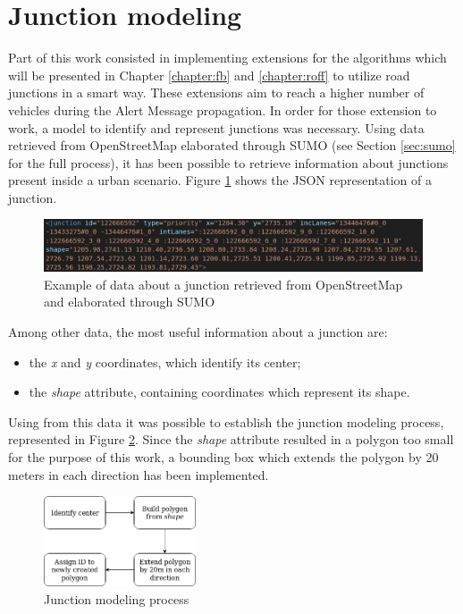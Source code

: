 	\section{Junction modeling}
		\label{sec:junction-modeling}
		Part of this work consisted in implementing extensions for the algorithms which will be presented in Chapter \ref{chapter:fb} and \ref{chapter:roff} to utilize road junctions in a smart way. These extensions aim to reach a higher number of vehicles during the Alert Message propagation. In order for those extension to work, a model to identify and represent junctions was necessary. Using data retrieved from OpenStreetMap elaborated through SUMO (see Section \ref{sec:sumo} for the full process), it has been possible to retrieve information about junctions present inside a urban scenario. Figure \ref{fig:junction} shows the JSON representation of a junction.
		
		\begin{figure}[H]
			\centering
			\includegraphics[width=\textwidth]{immagini/junction}
			\caption{Example of data about a junction retrieved from OpenStreetMap and elaborated through SUMO}
			\label{fig:junction}
		\end{figure}
		
		Among other data, the most useful information about a junction are:
		\begin{itemize}
			\item the \textit{x} and \textit{y} coordinates, which identify its center;
			\item the \textit{shape} attribute, containing coordinates which represent its shape.
		\end{itemize}
		
		Using from this data it was possible to establish the junction modeling process, represented in Figure \ref{fig:junction-process}. Since the \textit{shape} attribute resulted in a polygon too small for the purpose of this work, a bounding box which extends the polygon by 20 meters in each direction has been implemented.
		
		\begin{figure}[H]
			\centering
			\includegraphics[width=0.4\textwidth]{immagini/junction-process}
			\caption{Junction modeling process}
			\label{fig:junction-process}
		\end{figure}
	
